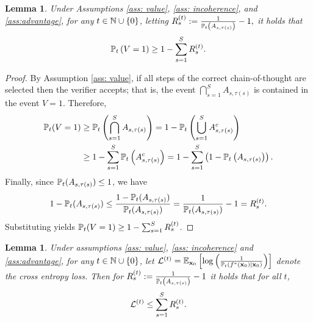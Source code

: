 \documentclass{article}
\theoremstyle{plain}
\newtheorem{lemma}[theorem]{Lemma}
\theoremstyle{definition}
\theoremstyle{remark}
\begin{document}
\begin{lemma}\label{lem:ver_bound}
    Under Assumptions \ref{ass: value}, \ref{ass: incoherence}, and \cref{ass:advantage}, for any $t\in\N\cup\{0\}$, letting $
    R^{(t)}_s := \frac{1}{\P_t\left(A_{s, \tau(s)} \right)} - 1,
    $
    it holds that
    \[
    \P_t\left(V=1\right) \ge 1 - \sum_{s=1}^S R^{(t)}_s.
    \]
\end{lemma}

\begin{proof}
    By Assumption \ref{ass: value}, if all steps of the correct chain-of-thought are selected then the verifier accepts; that is, the event $
    \bigcap_{s=1}^S A_{s,\tau(s)}$ is contained in the event $V=1$.
    Therefore,
    \begin{align*}
    \P_t(V=1)
    &\ge \P_t\left(\bigcap_{s=1}^S A_{s,\tau(s)}\right)
    = 1 - \P_t\left(\bigcup_{s=1}^S A_{s,\tau(s)}^c\right) \\
    &\ge 1 - \sum_{s=1}^S \P_t\left(A_{s,\tau(s)}^c\right)
    = 1 - \sum_{s=1}^S \left(1 - \P_t\left(A_{s,\tau(s)}\right)\right).
    \end{align*}
    Finally, since $\P_t(A_{s,\tau(s)})\leq1$, we have
    \[
    1 - \P_t(A_{s,\tau(s)}) \leq\frac{1-\P_t(A_{s,\tau(s)})}{\P_t(A_{s,\tau(s)})}
    = \frac{1}{\P_t(A_{s,\tau(s)})}-1
    = R_s^{(t)}.
    \]
    Substituting yields $\P_t(V=1) \ge 1 - \sum_{s=1}^S R^{(t)}_s$.
\end{proof}


\begin{lemma}\label{lem:loss_change}
Under assumptions \ref{ass: value}, \ref{ass: incoherence} and \cref{ass:advantage}, for any $t\in\N\cup\{0\}$, let $\Lcal^{(t)} = \E_{\bx_0}\left[\log\left(\frac{1}{\P_{t}(f^*(\bx_0) \mid \bx_0)}\right)\right]$ denote the cross entropy loss. Then for $R^{(t)}_s := \frac{1}{\P_t\left(A_{s, \tau(s)} \right)} - 1$
it holds that for all $t$, 
\begin{align*}
    \Lcal^{(t)} \leq \sum_{s=1}^S R^{(t)}_s.
\end{align*} 
\end{lemma}
\end{document}
